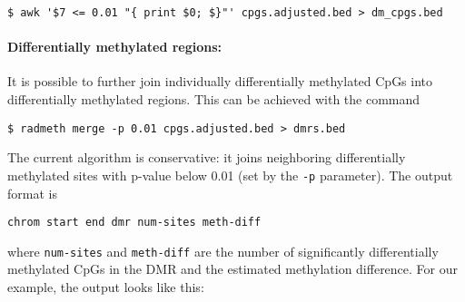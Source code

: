 \documentclass[10pt]{article}
\begin{document}
{\small{%
\begin{verbatim}
$ awk '$7 <= 0.01 "{ print $0; $}"' cpgs.adjusted.bed > dm_cpgs.bed
\end{verbatim}%
}}

\paragraph{Differentially methylated regions:} It is possible to further join
individually differentially methylated CpGs into differentially methylated
regions. This can be achieved with the command
{\small{%
\begin{verbatim}
$ radmeth merge -p 0.01 cpgs.adjusted.bed > dmrs.bed
\end{verbatim}%
}}

The current algorithm is conservative: it joins neighboring differentially
methylated sites with p-value below 0.01 (set by the {\tt -p} parameter).
The output format is
{\small{%
\begin{verbatim}
chrom start end dmr num-sites meth-diff
\end{verbatim}%
}}
\noindent where {\tt num-sites} and {\tt meth-diff} are the number of
significantly differentially methylated CpGs in the DMR and the estimated
methylation difference. For our example, the output looks like this:
\end{document}
